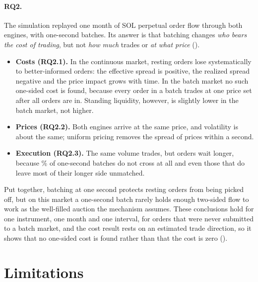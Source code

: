 \paragraph{RQ2.} The simulation replayed one month of SOL perpetual order
flow through both engines, with one-second batches. Its answer is that
batching changes \emph{who bears the cost of trading}, but not \emph{how
much} trades or \emph{at what price} ().

\begin{itemize}
  \item \textbf{Costs (RQ2.1).} In the continuous market, resting orders
  lose systematically to better-informed orders: the effective spread is
  positive, the realized spread negative and the price impact grows with
  time. In the batch market no such one-sided cost is found, because every
  order in a batch trades at one price set after all orders are in. Standing
  liquidity, however, is slightly lower in the batch market, not higher.
  \item \textbf{Prices (RQ2.2).} Both engines arrive at the same price, and
  volatility is about the same; uniform pricing removes the spread of prices
  within a second.
  \item \textbf{Execution (RQ2.3).} The same volume trades, but orders wait
  longer, because \FbaEmptyBatchShare\% of one-second batches do not cross at
  all and even those that do leave most of their longer side unmatched.
\end{itemize}

Put together, batching at one second protects resting orders from being
picked off, but on this market a one-second batch rarely holds enough
two-sided flow to work as the well-filled auction the mechanism assumes.
These conclusions hold for one instrument, one month and one interval, for
orders that were never submitted to a batch market, and the cost result
rests on an estimated trade direction, so it shows that no one-sided cost
is found rather than that the cost is zero ().

\section{Limitations}
\label{sec:limitations}

